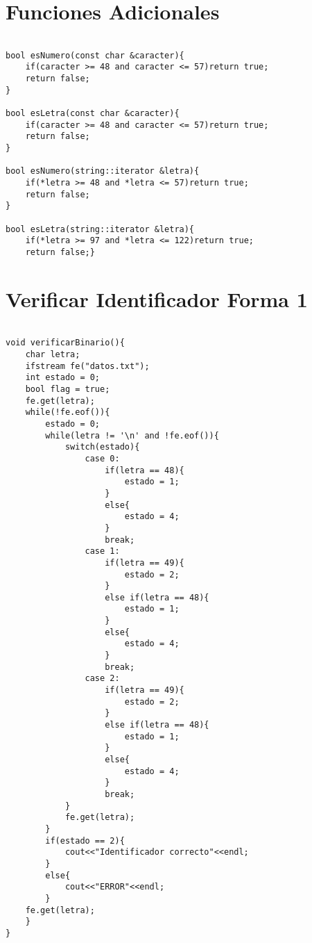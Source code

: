 \documentclass[a4paper,12pt]{article}
\begin{document}
\section{Funciones Adicionales}

\begin{lstlisting}

bool esNumero(const char &caracter){
    if(caracter >= 48 and caracter <= 57)return true;
    return false;
}

bool esLetra(const char &caracter){
    if(caracter >= 48 and caracter <= 57)return true;
    return false;
}

bool esNumero(string::iterator &letra){
    if(*letra >= 48 and *letra <= 57)return true;
    return false;
}

bool esLetra(string::iterator &letra){
    if(*letra >= 97 and *letra <= 122)return true;
    return false;}

\end{lstlisting}

\section{Verificar Identificador Forma 1}

\begin{lstlisting}

void verificarBinario(){
    char letra;
    ifstream fe("datos.txt");
    int estado = 0;
    bool flag = true;
    fe.get(letra);
    while(!fe.eof()){
        estado = 0;
        while(letra != '\n' and !fe.eof()){
            switch(estado){
                case 0:
                    if(letra == 48){
                        estado = 1;
                    }
                    else{
                        estado = 4;
                    }
                    break;
                case 1:
                    if(letra == 49){
                        estado = 2;
                    }
                    else if(letra == 48){
                        estado = 1;
                    }
                    else{
                        estado = 4;
                    }
                    break;
                case 2:
                    if(letra == 49){
                        estado = 2;
                    }
                    else if(letra == 48){
                        estado = 1;
                    }
                    else{
                        estado = 4;
                    }
                    break;
            }
            fe.get(letra);
        }
        if(estado == 2){
            cout<<"Identificador correcto"<<endl;
        }
        else{
            cout<<"ERROR"<<endl;
        }
    fe.get(letra);
    }
}
\end{lstlisting}
\end{document}
